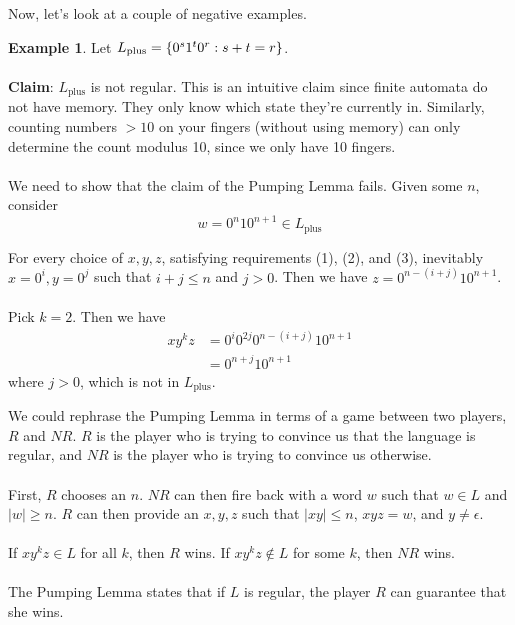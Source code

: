 \documentclass[]{article}
\DeclarePairedDelimiter{\set}{\lbrace}{\rbrace}
\theoremstyle{definition}
\newtheorem{ex}{Example}[section]
\begin{document}
        Now, let's look at a couple of negative examples.
        \begin{ex}
          Let $L_\text{plus} = \set{0^s 1^t 0^r : s + t = r}$.
          \\ \\
          \textbf{Claim}: $L_\text{plus}$ is not regular. This is an intuitive claim since finite automata do not have memory. They only know which state they're currently in. Similarly, counting numbers $> 10$ on your fingers (without using memory) can only determine the count modulus 10, since we only have 10 fingers.
          \\ \\
          We need to show that the claim of the Pumping Lemma fails. Given some $n$, consider
          $$
            w = 0^n 1 0^{n + 1} \in L_\text{plus}
          $$

          For every choice of $x, y, z$, satisfying requirements (1), (2), and (3), inevitably $x = 0^i, y = 0^j$ such that $i+j \le n$ and $j > 0$. Then we have $z = 0^{n - (i + j)} 1 0^{n + 1}$.
          \\ \\
          Pick $k = 2$. Then we have
          \begin{align*}
            xy^kz &= 0^i 0^{2j} 0^{n - (i + j)} 1 0^{n + 1} \\
            &= 0^{n + j} 1 0^{n + 1}
          \end{align*}
          where $j > 0$, which is not in $L_\text{plus}$.
        \end{ex}

        We could rephrase the Pumping Lemma in terms of a game between two players, $R$ and $NR$. $R$ is the player who is trying to convince us that the language is regular, and $NR$ is the player who is trying to convince us otherwise.
        \\ \\
        First, $R$ chooses an $n$. $NR$ can then fire back with a word $w$ such that $w \in L$ and $|w| \ge n$. $R$ can then provide an $x, y, z$ such that $|xy| \le n$, $xyz = w$, and $y \ne \epsilon$.
        \\ \\
        If $xy^kz \in L$ for all $k$, then $R$ wins. If $xy^kz \not \in L$ for some $k$, then $NR$ wins.
        \\ \\
        The Pumping Lemma states that if $L$ is regular, the player $R$ can guarantee that she wins.
\end{document}
